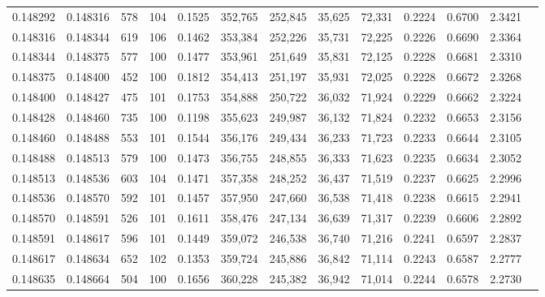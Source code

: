\begin{tabular}{rrrrrrrrrrrrr}
0.148292 & 0.148316 &   578 & 104 &                                     0.1525 & 352,765 & 252,845 &  35,625 &  72,331 & 0.2224 & 0.6700 & 2.3421 \\
0.148316 & 0.148344 &   619 & 106 &                                     0.1462 & 353,384 & 252,226 &  35,731 &  72,225 & 0.2226 & 0.6690 & 2.3364 \\
0.148344 & 0.148375 &   577 & 100 &                                     0.1477 & 353,961 & 251,649 &  35,831 &  72,125 & 0.2228 & 0.6681 & 2.3310 \\
0.148375 & 0.148400 &   452 & 100 &                                     0.1812 & 354,413 & 251,197 &  35,931 &  72,025 & 0.2228 & 0.6672 & 2.3268 \\
0.148400 & 0.148427 &   475 & 101 &                                     0.1753 & 354,888 & 250,722 &  36,032 &  71,924 & 0.2229 & 0.6662 & 2.3224 \\
0.148428 & 0.148460 &   735 & 100 &                                     0.1198 & 355,623 & 249,987 &  36,132 &  71,824 & 0.2232 & 0.6653 & 2.3156 \\
0.148460 & 0.148488 &   553 & 101 &                                     0.1544 & 356,176 & 249,434 &  36,233 &  71,723 & 0.2233 & 0.6644 & 2.3105 \\
0.148488 & 0.148513 &   579 & 100 &                                     0.1473 & 356,755 & 248,855 &  36,333 &  71,623 & 0.2235 & 0.6634 & 2.3052 \\
0.148513 & 0.148536 &   603 & 104 &                                     0.1471 & 357,358 & 248,252 &  36,437 &  71,519 & 0.2237 & 0.6625 & 2.2996 \\
0.148536 & 0.148570 &   592 & 101 &                                     0.1457 & 357,950 & 247,660 &  36,538 &  71,418 & 0.2238 & 0.6615 & 2.2941 \\
0.148570 & 0.148591 &   526 & 101 &                                     0.1611 & 358,476 & 247,134 &  36,639 &  71,317 & 0.2239 & 0.6606 & 2.2892 \\
0.148591 & 0.148617 &   596 & 101 &                                     0.1449 & 359,072 & 246,538 &  36,740 &  71,216 & 0.2241 & 0.6597 & 2.2837 \\
0.148617 & 0.148634 &   652 & 102 &                                     0.1353 & 359,724 & 245,886 &  36,842 &  71,114 & 0.2243 & 0.6587 & 2.2777 \\
0.148635 & 0.148664 &   504 & 100 &                                     0.1656 & 360,228 & 245,382 &  36,942 &  71,014 & 0.2244 & 0.6578 & 2.2730 \\

\end{tabular}
